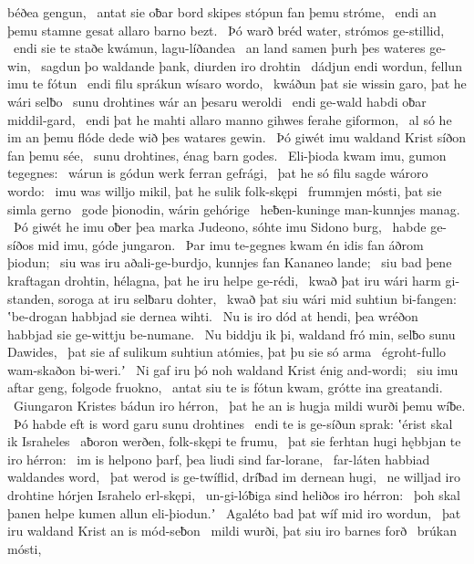 béðea gengun, \hld\ antat sie oƀar bord skipes
stópun fan þemu stróme, \hld\ endi an þemu stamne gesat
allaro barno bezt. \hld\ Þó warð bréd water,
strómos ge-stillid, \hld\ endi sie te staðe kwámun,
lagu-líðandea \hld\ an land samen
þurh þes wateres ge-win, \hld\ sagdun þo waldande þank,
diurden iro drohtin \hld\ dádjun endi wordun,
fellun imu te fótun \hld\ endi filu sprákun
wísaro wordo, \hld\ kwáðun þat sie wissin garo,
þat he wári selƀo \hld\ sunu drohtines
wár an þesaru weroldi \hld\ endi ge-wald habdi
oƀar middil-gard, \hld\ endi þat he mahti allaro manno gihwes
ferahe giformon, \hld\ al só he im an þemu flóde dede
wið þes watares gewin. \hld\ Þó giwét imu waldand Krist
síðon fan þemu sée, \hld\ sunu drohtines,
énag barn godes. \hld\ Eli-þioda kwam imu,
gumon tegegnes: \hld\ wárun is gódun werk
ferran gefrági, \hld\ þat he só filu sagde
wároro wordo: \hld\ imu was willjo mikil,
þat he sulik folk-skępi \hld\ frummjen mósti,
þat sie simla gerno \hld\ gode þionodin,
wárin gehórige \hld\ heƀen-kuninge
man-kunnjes manag. \hld\ Þó giwét he imu oƀer þea marka Judeono,
sóhte imu Sidono burg, \hld\ habde ge-síðos mid imu,
góde jungaron. \hld\ Þar imu te-gegnes kwam
én idis fan áðrom þiodun; \hld\ siu was iru aðali-ge-burdjo,
kunnjes fan Kananeo lande; \hld\ siu bad þene kraftagan drohtin,
hélagna, þat he iru helpe ge-rédi, \hld\ kwað þat iru wári harm gi-standen,
soroga at iru selƀaru dohter, \hld\ kwað þat siu wári mid suhtiun bi-fangen:
ʽbe-drogan habbjad sie dernea wihti. \hld\ Nu is iro dód at hendi,
þea wréðon habbjad sie ge-wittju be-numane. \hld\ Nu biddju ik þi, waldand fró min,
selƀo sunu Dawides, \hld\ þat sie af sulikum suhtiun atómies,
þat þu sie só arma \hld\ égroht-fullo
wam-skaðon bi-weri.ʼ \hld\ Ni gaf iru þó noh waldand Krist
énig and-wordi; \hld\ siu imu aftar geng,
folgode fruokno, \hld\ antat siu te is fótun kwam,
grótte ina greatandi. \hld\ Giungaron Kristes
bádun iro hérron, \hld\ þat he an is hugja mildi
wurði þemu wíƀe. \hld\ Þó habde eft is word garu
sunu drohtines \hld\ endi te is ge-síðun sprak:
ʽérist skal ik Israheles \hld\ aƀoron werðen,
folk-skępi te frumu, \hld\ þat sie ferhtan hugi
hębbjan te iro hérron: \hld\ im is helpono þarf,
þea liudi sind far-lorane, \hld\ far-láten habbiad
waldandes word, \hld\ þat werod is ge-twíflid,
dríƀad im dernean hugi, \hld\ ne willjad iro drohtine hórjen
Israhelo erl-skępi, \hld\ un-gi-lóƀiga sind
heliðos iro hérron: \hld\ þoh skal þanen helpe kumen
allun eli-þiodun.ʼ \hld\ Agaléto bad
þat wíf mid iro wordun, \hld\ þat iru waldand Krist
an is mód-seƀon \hld\ mildi wurði,
þat siu iro barnes forð \hld\ brúkan mósti,

